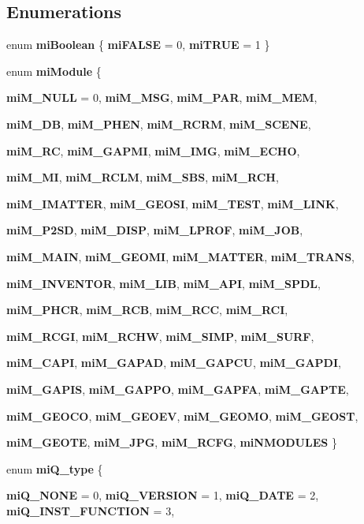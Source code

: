 \subsection*{Enumerations}
\begin{CompactItemize}
\item 
enum {\bf mi\-Boolean} \{ {\bf mi\-FALSE} = 0, 
{\bf mi\-TRUE} = 1
 \}
\item 
enum {\bf mi\-Module} \{ \par
{\bf mi\-M\_\-NULL} =  0, 
{\bf mi\-M\_\-MSG}, 
{\bf mi\-M\_\-PAR}, 
{\bf mi\-M\_\-MEM}, 
\par
{\bf mi\-M\_\-DB}, 
{\bf mi\-M\_\-PHEN}, 
{\bf mi\-M\_\-RCRM}, 
{\bf mi\-M\_\-SCENE}, 
\par
{\bf mi\-M\_\-RC}, 
{\bf mi\-M\_\-GAPMI}, 
{\bf mi\-M\_\-IMG}, 
{\bf mi\-M\_\-ECHO}, 
\par
{\bf mi\-M\_\-MI}, 
{\bf mi\-M\_\-RCLM}, 
{\bf mi\-M\_\-SBS}, 
{\bf mi\-M\_\-RCH}, 
\par
{\bf mi\-M\_\-IMATTER}, 
{\bf mi\-M\_\-GEOSI}, 
{\bf mi\-M\_\-TEST}, 
{\bf mi\-M\_\-LINK}, 
\par
{\bf mi\-M\_\-P2SD}, 
{\bf mi\-M\_\-DISP}, 
{\bf mi\-M\_\-LPROF}, 
{\bf mi\-M\_\-JOB}, 
\par
{\bf mi\-M\_\-MAIN}, 
{\bf mi\-M\_\-GEOMI}, 
{\bf mi\-M\_\-MATTER}, 
{\bf mi\-M\_\-TRANS}, 
\par
{\bf mi\-M\_\-INVENTOR}, 
{\bf mi\-M\_\-LIB}, 
{\bf mi\-M\_\-API}, 
{\bf mi\-M\_\-SPDL}, 
\par
{\bf mi\-M\_\-PHCR}, 
{\bf mi\-M\_\-RCB}, 
{\bf mi\-M\_\-RCC}, 
{\bf mi\-M\_\-RCI}, 
\par
{\bf mi\-M\_\-RCGI}, 
{\bf mi\-M\_\-RCHW}, 
{\bf mi\-M\_\-SIMP}, 
{\bf mi\-M\_\-SURF}, 
\par
{\bf mi\-M\_\-CAPI}, 
{\bf mi\-M\_\-GAPAD}, 
{\bf mi\-M\_\-GAPCU}, 
{\bf mi\-M\_\-GAPDI}, 
\par
{\bf mi\-M\_\-GAPIS}, 
{\bf mi\-M\_\-GAPPO}, 
{\bf mi\-M\_\-GAPFA}, 
{\bf mi\-M\_\-GAPTE}, 
\par
{\bf mi\-M\_\-GEOCO}, 
{\bf mi\-M\_\-GEOEV}, 
{\bf mi\-M\_\-GEOMO}, 
{\bf mi\-M\_\-GEOST}, 
\par
{\bf mi\-M\_\-GEOTE}, 
{\bf mi\-M\_\-JPG}, 
{\bf mi\-M\_\-RCFG}, 
{\bf mi\-NMODULES}
 \}
\item 
enum {\bf mi\-Q\_\-type} \{ \par
{\bf mi\-Q\_\-NONE} =  0, 
{\bf mi\-Q\_\-VERSION} =  1, 
{\bf mi\-Q\_\-DATE} =  2, 
{\bf mi\-Q\_\-INST\_\-FUNCTION} =  3, 
\par

\end{CompactItemize}
